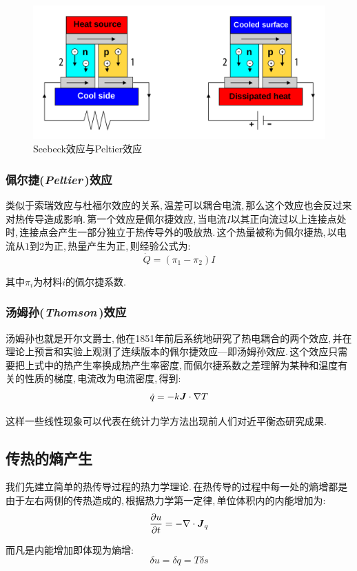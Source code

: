 \begin{figure}[H]
\centering
\includegraphics[width=13cm]{image/5-2-21.png}
\caption{Seebeck效应与Peltier效应}\label{fig5-2-21}
\end{figure}

\subsubsection{\hei 佩尔捷({\it Peltier\,})效应}
类似于索瑞效应与杜福尔效应的关系,\,温差可以耦合电流,\,那么这个效应也会反过来对热传导造成影响.\,第一个效应是佩尔捷效应,\,当电流\(I\)以其正向流过以上连接点处时,\,连接点会产生一部分独立于热传导外的吸放热.\,这个热量被称为佩尔捷热,\,以电流从\(1\)到\(2\)为正,\,热量产生为正,\,则经验公式为:
\[\dot{Q}=(\pi_1-\pi_2)I\]

其中\(\pi_i\)为材料\(i\)的佩尔捷系数.

\subsubsection{\hei 汤姆孙({\it Thomson\,})效应}
汤姆孙也就是开尔文爵士,\,他在1851年前后系统地研究了热电耦合的两个效应,\,并在理论上预言和实验上观测了连续版本的佩尔捷效应---即汤姆孙效应.\,这个效应只需要把上式中的热产生率换成热产生率密度,\,而佩尔捷系数之差理解为某种和温度有关的性质的梯度,\,电流改为电流密度,\,得到:
\[\dot{q}=-k\boldsymbol{J}\cdot\nabla T\]

这样一些线性现象可以代表在统计力学方法出现前人们对近平衡态研究成果.

\subsection{传热的熵产生}
我们先建立简单的热传导过程的热力学理论.\,在热传导的过程中每一处的熵增都是由于左右两侧的传热造成的,\,根据热力学第一定律,\,单位体积内的内能增加为:
\[\frac{\partial u}{\partial t}=-\nabla\cdot\boldsymbol{J}_q\]

而凡是内能增加即体现为熵增:
\[\delta u=\delta q=T\delta s\]

